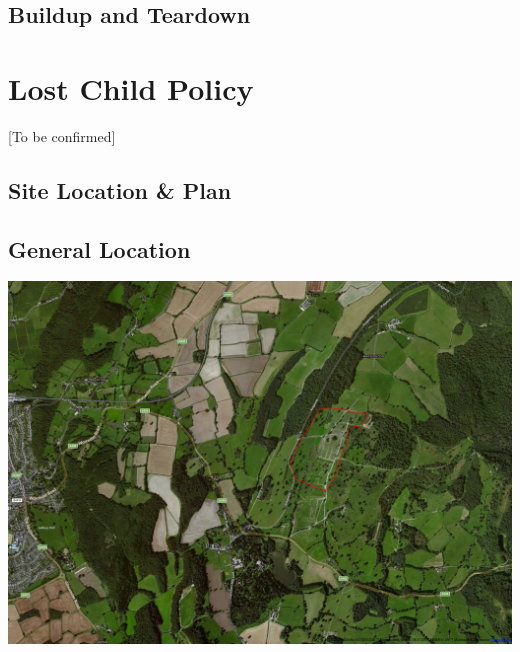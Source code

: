 \begin{landscape}
    \subsection{Buildup and Teardown}
    

\end{landscape}
\restoregeometry
\appendix

\section{Lost Child Policy}
\label{lost-child-policy}
[To be confirmed]
\newpage

\begin{landscape}
    \thispagestyle{empty}
    \section{Site Location \& Plan}
    \label{site-plan}
    \subsection{General Location}
    \includegraphics[width=23cm]{./supplementary/wide-map.png}
\end{landscape}

